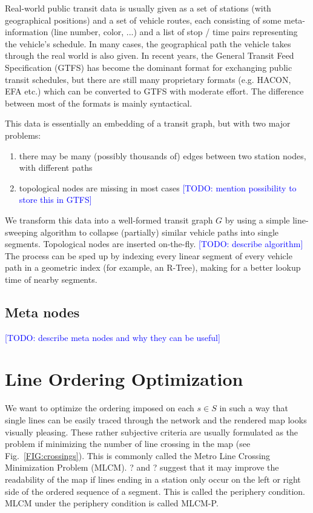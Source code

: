 \documentclass{llncs}
\newcommand\todo[1]{\textcolor{blue}{[TODO: #1]}}
\begin{document}
Real-world public transit data is usually given as a set of stations (with geographical positions) and a set of vehicle routes, each consisting of some meta-information (line number, color, ...) and a list of stop / time pairs representing the vehicle's schedule. In many cases, the geographical path the vehicle takes through the real world is also given. In recent years, the General Transit Feed Specification (GTFS) has become the dominant format for exchanging public transit schedules, but there are still many proprietary formats (e.g. HACON, EFA etc.) which can be converted to GTFS with moderate effort. The difference between most of the formats is mainly syntactical.

This data is essentially an embedding of a transit graph, but with two major problems:
\begin{enumerate}
	\item there may be many (possibly thousands of) edges between two station nodes, with different paths
	\item topological nodes are missing in most cases \todo{mention possibility to store this in GTFS}
\end{enumerate}

We transform this data into a well-formed transit graph $G$ by using a simple line-sweeping algorithm to collapse (partially) similar vehicle paths into single segments. Topological nodes are inserted on-the-fly.
\todo{describe algorithm}
% 
The process can be sped up by indexing every linear segment of every vehicle path in a geometric index (for example, an R-Tree), making for a better lookup time of nearby segments.

%
\subsection{Meta nodes}\label{SEC:metanodes}
%
\todo{describe meta nodes and why they can be useful}

%
\section{Line Ordering Optimization}\label{SEC:ordering}
%
We want to optimize the ordering imposed on each $s \in S$ in such a way that single lines can be easily traced through the network and the rendered map looks visually pleasing. These rather subjective criteria are usually formulated as the problem if minimizing the number of line crossing in the map (see Fig.~\ref{FIG:crossings}). This is commonly called the Metro Line Crossing Minimization Problem (MLCM). ? and ? suggest that it may improve the readability of the map if lines ending in a station only occur on the left or right side of the ordered sequence of a segment. This is called the periphery condition. MLCM under the periphery condition is called MLCM-P.
\end{document}
